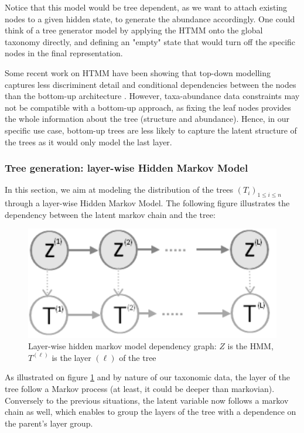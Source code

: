 Notice that this model would be tree dependent, as we want to attach existing nodes to a given hidden state, to generate
the abundance accordingly.
One could think of a tree generator model by applying the HTMM onto the global taxonomy directly, and defining an "empty"
state that would turn off the specific nodes in the final representation.

\medskip

Some recent work on HTMM have been showing that top-down modelling captures
less discriminent detail and conditional dependencies between the nodes than the bottom-up architecture \cite{bottom_up_superiority_hidden_tree_markov_models}.
However, taxa-abundance data constraints may not be compatible with a bottom-up approach,
as fixing the leaf nodes provides the whole information about the tree (structure and abundance).
Hence, in our specific use case, bottom-up trees are less likely to capture the latent structure of the trees
as it would only model the last layer.

\subsubsection{Tree generation: layer-wise Hidden Markov Model}

In this section, we aim at modeling the distribution of the trees $(T_i)_{1 \leq i \leq n}$ through a layer-wise Hidden Markov Model.
The following figure illustrates the dependency between the latent markov chain and the tree:
\begin{figure}[H]
    \centering
    \includegraphics[scale=.4]{images/layer_wise_hidden_markov_model_tree}
    \caption{Layer-wise hidden markov model dependency graph: $Z$ is the HMM, $T^{(\ell)}$ is the layer $(\ell)$ of the tree}
    \label{fig:layer_wise_hmm_tree}
\end{figure}

As illustrated on figure \ref{fig:layer_wise_hmm_tree} and by nature of our taxonomic data,
the layer of the tree follow a Markov process (at least, it could be deeper than markovian).
Conversely to the previous situations, the latent variable now follows a markov chain as well, which enables to
group the layers of the tree with a dependence on the parent's layer group.

